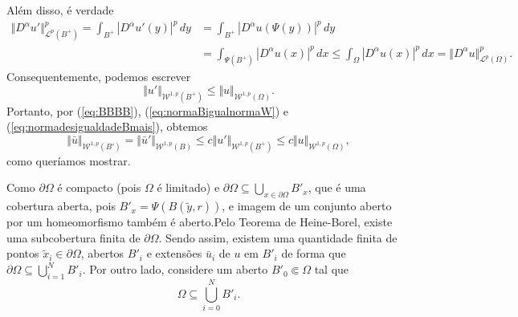 \documentclass[a4paper, 11pt]{book}
\theoremstyle{definition}
\newcommand{\cL}{\mathcal{L}}
\newcommand{\cW}{\mathcal{W}}
\begin{document}
\begin{prf}
\begin{equation}
    \end{equation}
    Além disso, é verdade
    \[
        \begin{aligned}
            \Vert D^\alpha u' \Vert_{\cL^p(B^+)}^p = \int_{B^+} |D^\alpha u'(y) |^p \,dy &= \int_{B^+} |D^\alpha u (\Psi(y))|^p \,dy\\ &= \int_{\Psi(B^+)} |D^\alpha u(x)|^p \,dx \leqslant \int_{\Omega} |D^\alpha u(x)|^p \,dx = \Vert D^\alpha u \Vert_{\cL^p(\Omega)}^p.
        \end{aligned}
    \]
    Consequentemente, podemos escrever
    \begin{equation} \label{eq:normadesigualdadeBmais}
        \Vert u' \Vert_{\cW^{1,p}(B^+)} \leqslant \Vert u \Vert_{\cW^{1,p}(\Omega)}.
    \end{equation}
    Portanto, por (\ref{eq:BBBB}), (\ref{eq:normaBigualnormaW}) e (\ref{eq:normadesigualdadeBmais}), obtemos
    \begin{equation} \label{eq:desigualdadeWO}
        \Vert \bar u \Vert_{\cW^{1,p}(B')} = \Vert \bar u' \Vert_{\cW^{1,p}(B)} \leqslant c \Vert u' \Vert_{\cW^{1,p}(B^+)} \leqslant c \Vert u \Vert_{\cW^{1,p}(\Omega)},
    \end{equation}
    como queríamos mostrar.

    Como $\partial\Omega$ é compacto (pois $\Omega$ é limitado) e $\partial \Omega \subseteq \bigcup_{x \in \partial\Omega} B'_x$,
    que é uma cobertura aberta, pois $B'_x = \Psi(B(\tilde y, r))$, e imagem de um conjunto aberto por um homeomorfismo também é aberto.Pelo Teorema de Heine-Borel, existe uma subcobertura finita de $\partial\Omega$.
    Sendo assim, existem uma quantidade finita de pontos $\tilde x_i \in \partial\Omega$, abertos $B'_i$ e extensões $\bar u_i$ de $u$ em $B'_i$ de forma que $\partial\Omega \subseteq \bigcup_{i=1}^N B'_i$.
    Por outro lado, considere um aberto $B'_0 \Subset \Omega$ tal que
    \[
        \Omega \subseteq \bigcup_{i=0}^N B'_i.
    \]


\end{prf}
\end{document}
